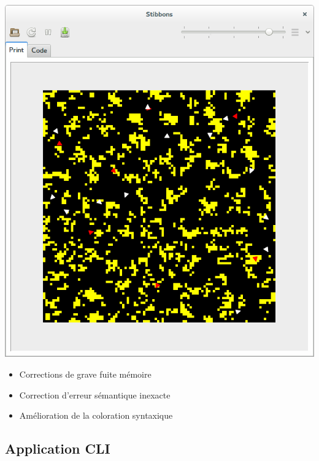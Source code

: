\begin{frame}
\begin{center}
\includegraphics[scale=0.16]{doc/report/screenshot/stibbons-0-5-3.png}
\end{center}

\begin{itemize}
	\item Corrections de grave fuite mémoire
	\item Correction d'erreur sémantique inexacte
	\item Amélioration de la coloration syntaxique
\end{itemize}
\end{frame}

\subsection{Application CLI}

